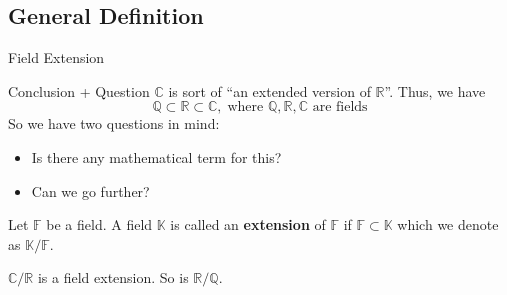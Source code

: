 \documentclass{zkdl-presentation-template}
\begin{document}
    \subsection{General Definition}
    \begin{frame}{Field Extension}
        \begin{remarkblock}{Conclusion + Question}
            $\mathbb{C}$ is sort of ``an extended version of $\mathbb{R}$''. Thus, we have
            \begin{equation*}
                \mathbb{Q} \subset \mathbb{R} \subset \mathbb{C}, \; \text{where $\mathbb{Q},\mathbb{R},\mathbb{C}$ are fields}
            \end{equation*}
            So we have two questions in mind:
            \begin{itemize}
                \item Is there any mathematical term for this?
                \item Can we go further?\pause
            \end{itemize}
        \end{remarkblock}

        \begin{definition}
            Let $\mathbb{F}$ be a field. A field $\mathbb{K}$ is called an \textbf{extension} of $\mathbb{F}$ if $\mathbb{F} \subset \mathbb{K}$ which we denote as $\mathbb{K}/\mathbb{F}$.\pause
        \end{definition}

        \begin{example}
            $\mathbb{C}/\mathbb{R}$ is a field extension. So is $\mathbb{R}/\mathbb{Q}$.
        \end{example}
    \end{frame}
\end{document}
